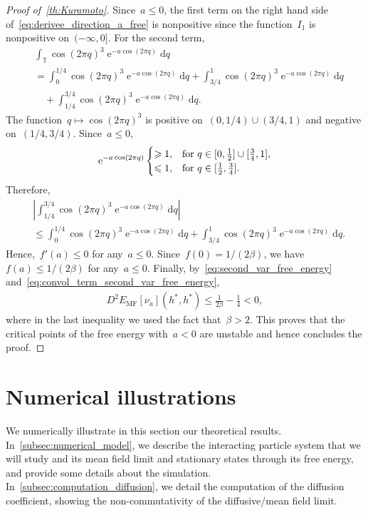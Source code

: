 \documentclass[onefignum,onetabnum]{siamart251216} %
\DeclareMathOperator{\e}{e}
\renewcommand{\d}{\mathrm{d}}
\newcommand{\torus}{\mathbb T}
\newcommand{\ee}{{\rm e}}
\renewcommand{\leq}{\leqslant}
\renewcommand{\ge}{\geqslant}
\newcommand{\mespos}{\nu}
\newcommand{\emf}{E_{\mathrm{MF}}}
\theoremstyle{plain}
\numberwithin{equation}{section}
\numberwithin{theorem}{section}
\begin{document}
\begin{proof}[Proof of~{\cref{th:Kuramoto}}]
Since~$a \leq 0$, the first term on the right hand side of~\eqref{eq:derivee_direction_a_free} is nonpositive since the function~$I_1$ is nonpositive on~$(-\infty,0]$. For the second term,
    \begin{align*}
        &\int_{\torus} \cos(2\pi q)^3 \e^{-a\cos(2\pi q)} \d q \\
         &=  \int_{0}^{1/4} \cos(2\pi q)^3 \e^{-a\cos(2\pi q)} \d q + \int_{3/4}^{1} \cos(2\pi q)^3 \e^{-a\cos(2\pi q)} \d q \\
        &\quad + \int_{1/4}^{3/4} \cos(2\pi q)^3 \e^{-a\cos(2\pi q)} \d q.
    \end{align*}
    The function~$q \mapsto \cos(2\pi q)^3$ is positive on~$(0,1/4)\cup (3/4,1)$ and negative on~$(1/4,3/4)$. Since~$a\leq 0$,
    \begin{align*}
\ee^{-a \cos(2\pi q)}
\begin{cases}
\ge 1, & \text{for } q \in [0,\tfrac{1}{2}] \cup [\tfrac{3}{4},1], \\
\leq 1, & \text{for } q \in [\tfrac{1}{2},\tfrac{3}{4}].
\end{cases}
    \end{align*}
    Therefore,
    \begin{align*}
    &\left|\int_{1/4}^{3/4} \cos(2\pi q)^3 \e^{-a\cos(2\pi q)} \d q\right| \\
    &\leq \int_{0}^{1/4} \cos(2\pi q)^3 \e^{-a\cos(2\pi q)} \d q + \int_{3/4}^{1} \cos(2\pi q)^3 \e^{-a\cos(2\pi q)} \d q.
    \end{align*}
    Hence,~$f'(a) \leq 0$ for any~$a \leq 0$. Since~$f(0) = 1/(2\beta)$, we have~$f(a) \leq 1/(2\beta)$ for any~$a \leq 0$. Finally, by~\eqref{eq:second_var_free_energy} and~\eqref{eq:convol_term_second_var_free_energy},
    \begin{align*}
        D^2 \emf[\mespos_a](h^*,h^*) \leq \frac{1}{2\beta} - \frac14 < 0,
    \end{align*}
    where in the last inequality we used the fact that~$\beta > 2$. This proves that the critical points of the free energy with~$a < 0$ are unstable and hence concludes the proof.
\end{proof}
\section{Numerical illustrations}
\label{sec:numerical_simulation}
We numerically illustrate in this section our theoretical results.
In~\cref{subsec:numerical_model}, we describe the interacting particle system that we will study and its mean field limit and stationary states through its free energy, and provide some details about the simulation. In~\cref{subsec:computation_diffusion}, we detail the computation of the diffusion coefficient, showing the non-commutativity of the diffusive/mean field limit.
%
%
\end{document}
